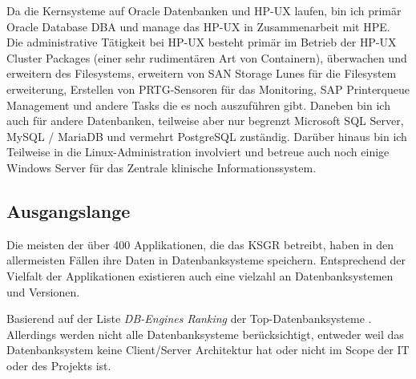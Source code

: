 \begin{flushleft}
    Da die Kernsysteme auf Oracle Datenbanken und \Gls{HP-UX} laufen, bin ich primär \Gls{Oracle Database} DBA und manage das \Gls{HP-UX} in Zusammenarbeit mit HPE.
    Die administrative Tätigkeit bei \Gls{HP-UX} besteht primär im Betrieb der \Gls{HP-UX} Cluster Packages (einer sehr
    rudimentären Art von Containern), überwachen und erweitern des Filesystems, erweitern von \Gls{SAN} Storage Lunes für die Filesystem erweiterung, Erstellen von \Gls{PRTG}-Sensoren für
    das Monitoring, SAP Printerqueue Management und andere Tasks die es noch auszuführen gibt.
    Daneben bin ich auch für andere Datenbanken, teilweise aber nur begrenzt \Gls{Microsoft SQL Server}, \Gls{MySQL} /
    \Gls{MariaDB} und vermehrt \Gls{PostgreSQL} zuständig.
    Darüber hinaus bin ich Teilweise in die \Gls{Linux}-Administration involviert und betreue auch noch einige Windows Server für das Zentrale klinische Informationssystem.
\end{flushleft}
\begin{flushleft}
    \subsection{Ausgangslange}
    Die meisten der über 400 Applikationen, die das KSGR betreibt, haben in den allermeisten Fällen ihre Daten in Datenbanksysteme speichern.
    Entsprechend der Vielfalt der Applikationen existieren auch eine vielzahl an Datenbanksystemen und Versionen.
\end{flushleft}
\begin{flushleft}
    Basierend auf der Liste \textit{DB-Engines Ranking}\cite{TTVGIG2P} der Top-Datenbanksysteme .
    Allerdings werden nicht alle Datenbanksysteme berücksichtigt, entweder weil das Datenbanksystem keine Client/Server Architektur hat oder nicht im Scope der IT oder des Projekts ist.
\end{flushleft}
\clearpage
{}
\recalctypearea
